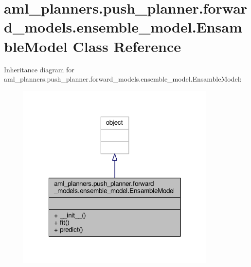 \hypertarget{classaml__planners_1_1push__planner_1_1forward__models_1_1ensemble__model_1_1_ensamble_model}{\section{aml\-\_\-planners.\-push\-\_\-planner.\-forward\-\_\-models.\-ensemble\-\_\-model.\-Ensamble\-Model Class Reference}
\label{classaml__planners_1_1push__planner_1_1forward__models_1_1ensemble__model_1_1_ensamble_model}
}


Inheritance diagram for aml\-\_\-planners.\-push\-\_\-planner.\-forward\-\_\-models.\-ensemble\-\_\-model.\-Ensamble\-Model\-:
\nopagebreak
\begin{figure}[H]
\begin{center}
\leavevmode
\includegraphics[width=282pt]{classaml__planners_1_1push__planner_1_1forward__models_1_1ensemble__model_1_1_ensamble_model__inherit__graph}
\end{center}
\end{figure}


